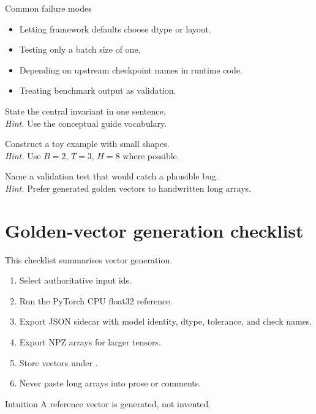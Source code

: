 \begin{warningbox}{Common failure modes}
\begin{itemize}
\item Letting framework defaults choose dtype or layout.
\item Testing only a batch size of one.
\item Depending on upstream checkpoint names in runtime code.
\item Treating benchmark output as validation.
\end{itemize}
\end{warningbox}

\begin{chapterexercises}
\item State the central invariant in one sentence.\\
\textit{Hint.} Use the conceptual guide vocabulary.
\item Construct a toy example with small shapes.\\
\textit{Hint.} Use $B=2$, $T=3$, $H=8$ where possible.
\item Name a validation test that would catch a plausible bug.\\
\textit{Hint.} Prefer generated golden vectors to handwritten long arrays.
\end{chapterexercises}

\chapter{Golden-vector generation checklist}
\label{app:golden-check}
This checklist summarises vector generation.


\begin{enumerate}[label=\textbf{H.\arabic*.}]
\item Select authoritative input ids.
\item Run the PyTorch CPU float32 reference.
\item Export JSON sidecar with model identity, dtype, tolerance, and check names.
\item Export NPZ arrays for larger tensors.
\item Store vectors under .
\item Never paste long arrays into prose or comments.
\end{enumerate}


\begin{intuitionbox}{Intuition}
A reference vector is generated, not invented.
\end{intuitionbox}

